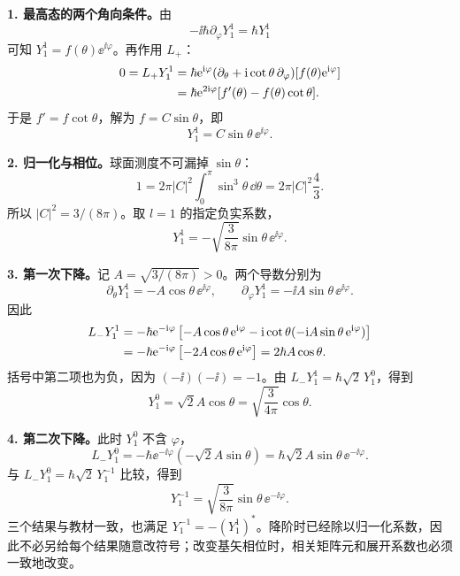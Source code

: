 \begin{checkedsolution}
\textbf{1. 最高态的两个角向条件。}由
\begin{equation}
  -\ii\hbar\partial_\varphi Y_1^1=\hbar Y_1^1
\end{equation}
可知 $Y_1^1=f(\theta)\ee^{\ii\varphi}$。再作用 $L_+$：
\begin{align}
  0=L_+Y_1^1
    &=\hbar\mathrm{e}^{\mathrm{i}\varphi}
       (\partial_\theta+\mathrm{i}\cot\theta\,\partial_\varphi)
       [f(\theta)\mathrm{e}^{\mathrm{i}\varphi}]\notag\\
    &=\hbar\mathrm{e}^{2\mathrm{i}\varphi}[f'(\theta)-f(\theta)\cot\theta].
\end{align}
于是 $f'=f\cot\theta$，解为 $f=C\sin\theta$，即
\begin{equation}
  Y_1^1=C\sin\theta\,\ee^{\ii\varphi}.
\end{equation}

\textbf{2. 归一化与相位。}球面测度不可漏掉 $\sin\theta$：
\begin{equation}
  1=2\pi|C|^2\int_0^\pi\sin^3\theta\,\dd\theta
    =2\pi|C|^2\frac43.
\end{equation}
所以 $|C|^2=3/(8\pi)$。取 $l=1$ 的指定负实系数，
\begin{equation}
  \boxed{Y_1^1=-\sqrt{\frac3{8\pi}}\sin\theta\,\ee^{\ii\varphi}.}
\end{equation}

\textbf{3. 第一次下降。}记 $A=\sqrt{3/(8\pi)}>0$。两个导数分别为
\begin{equation}
  \partial_\theta Y_1^1=-A\cos\theta\,\ee^{\ii\varphi},
  \qquad
  \partial_\varphi Y_1^1=-\ii A\sin\theta\,\ee^{\ii\varphi}.
\end{equation}
因此
\begin{align}
  L_-Y_1^1
   &=-\hbar\mathrm{e}^{-\mathrm{i}\varphi}
      \left[-A\cos\theta\,\mathrm{e}^{\mathrm{i}\varphi}
      -\mathrm{i}\cot\theta(-\mathrm{i} A\sin\theta\,\mathrm{e}^{\mathrm{i}\varphi})\right]
      \notag\\
   &=-\hbar\mathrm{e}^{-\mathrm{i}\varphi}
      \left[-2A\cos\theta\,\mathrm{e}^{\mathrm{i}\varphi}\right]
    =2\hbar A\cos\theta.
\end{align}
括号中第二项也为负，因为 $(-\ii)(-\ii)=-1$。由
$L_-Y_1^1=\hbar\sqrt2\,Y_1^0$，得到
\begin{equation}
  \boxed{Y_1^0=\sqrt2 A\cos\theta
    =\sqrt{\frac3{4\pi}}\cos\theta.}
\end{equation}

\textbf{4. 第二次下降。}此时 $Y_1^0$ 不含 $\varphi$，
\begin{equation}
  L_-Y_1^0
   =-\hbar\ee^{-\ii\varphi}(-\sqrt2 A\sin\theta)
   =\hbar\sqrt2 A\sin\theta\,\ee^{-\ii\varphi}.
\end{equation}
与 $L_-Y_1^0=\hbar\sqrt2\,Y_1^{-1}$ 比较，得到
\begin{equation}
  \boxed{Y_1^{-1}=\sqrt{\frac3{8\pi}}\sin\theta\,\ee^{-\ii\varphi}.}
\end{equation}
三个结果与教材一致，也满足 $Y_1^{-1}=-(Y_1^1)^*$。降阶时已经除以归一化系数，因此不必另给每个结果随意改符号；改变基矢相位时，相关矩阵元和展开系数也必须一致地改变。
\end{checkedsolution}


